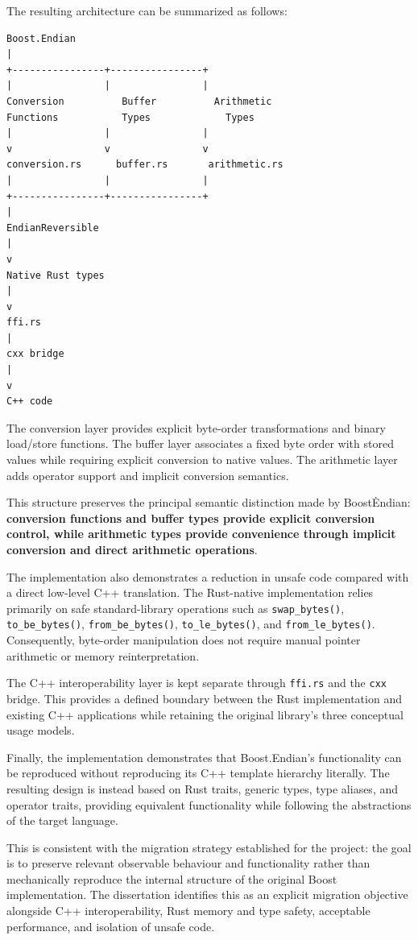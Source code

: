 The resulting architecture can be summarized as follows:

\begin{lstlisting}[style=textblock]
Boost.Endian
|
+----------------+----------------+
|                |                |
Conversion          Buffer          Arithmetic
Functions           Types             Types
|                |                |
v                v                v
conversion.rs      buffer.rs       arithmetic.rs
|                |                |
+----------------+----------------+
|
EndianReversible
|
v
Native Rust types
|
v
ffi.rs
|
cxx bridge
|
v
C++ code
\end{lstlisting}

The conversion layer provides explicit byte-order transformations and binary load/store functions. The buffer layer associates a fixed byte 
order with stored values while requiring explicit conversion to native values. The arithmetic layer adds operator support and implicit 
conversion semantics.

This structure preserves the principal semantic distinction made by Boost\.Endian: 
\textbf{conversion functions and buffer types provide explicit conversion control, while arithmetic types provide convenience through 
implicit conversion and direct arithmetic operations}.

The implementation also demonstrates a reduction in unsafe code compared with a direct low-level C++ translation. The Rust-native 
implementation relies primarily on safe standard-library operations such as \texttt{swap\_bytes()}, \texttt{to\_be\_bytes()}, 
\texttt{from\_be\_bytes()}, \texttt{to\_le\_bytes()}, and \texttt{from\_le\_bytes()}. 
Consequently, byte-order manipulation does not require manual pointer arithmetic or memory reinterpretation.

The C++ interoperability layer is kept separate through \texttt{ffi.rs} and the \texttt{cxx} bridge. This provides a defined boundary 
between the Rust implementation and existing C++ applications while retaining the original library's three conceptual usage models.

Finally, the implementation demonstrates that Boost.Endian's functionality can be reproduced without reproducing its C++ template hierarchy 
literally. The resulting design is instead based on Rust traits, generic types, type aliases, and operator traits, providing equivalent 
functionality while following the abstractions of the target language.

This is consistent with the migration strategy established for the project: the goal is to preserve relevant observable behaviour and 
functionality rather than mechanically reproduce the internal structure of the original Boost implementation. 
The dissertation identifies this as an explicit migration objective alongside C++ interoperability, Rust memory and type safety, acceptable 
performance, and isolation of unsafe code.

